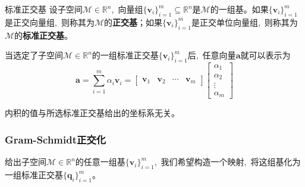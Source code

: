 \documentclass[10pt, a4paper, oneside, fontset=none]{ctexart}
\theoremstyle{plain}
\theoremstyle{definition}
\newcommand{\com}{,\,\,\,\:}
\newcommand{\de}[2][]{\begin{defil}{#1}\kai #2\end{defil}}
\newcommand{\R}{\mathbb{R}}
\newcommand{\tboba}[1]{\textbf{\kai\color{bali!75!black}#1}}
\begin{document}
\de[标准正交基]{
    设子空间$\mathcal{M}\in \R^n$\com 向量组$\{\boldsymbol{v}_i\}_{i=1}^m\subseteq\R^n$是$\mathcal{M}$的一组基。如果$\{\boldsymbol{v}_i\}_{i=1}^m$是正交向量组\com 则称其为$\mathcal{M}$的\tboba{正交基}；如果$\{\boldsymbol{v}_i\}_{i=1}^m$是正交单位向量组\com 则称其为$\mathcal{M}$的\tboba{标准正交基}。
}
当选定了子空间$\mathcal{M}\in \R^n$的一组标准正交基$\{\boldsymbol{v}_i\}_{i=1}^m$后\com 任意向量$\boldsymbol{a}$就可以表示为
$$\boldsymbol{a}=\sum_{i=1}^{m}\alpha_i\boldsymbol{v}_i=\begin{bmatrix}
    \boldsymbol{v}_1 & \boldsymbol{v}_2 & \cdots & \boldsymbol{v}_m
\end{bmatrix}\begin{bmatrix}
    \alpha_1 \\ \alpha_2 \\ \vdots \\ \alpha_m 
\end{bmatrix}$$

内积的值与所选标准正交基给出的坐标系无关。

\subsubsection{Gram-Schmidt正交化}
给出子空间$\mathcal{M}\in \R^n$的任意一组基$\{\boldsymbol{v}_i\}_{i=1}^m$\com 我们希望构造一个映射\com 将这组基化为一组标准正交基$\{\boldsymbol{q}_i\}_{i=1}^m$。
\end{document}
